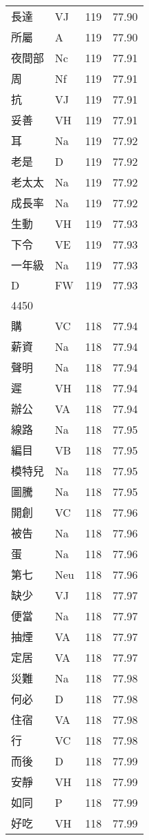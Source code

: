 \documentclass[twocolumn]{book}
\begin{document}
\begin{supertabular}{llrr}
長達 & VJ & 119 &  77.90\\
所屬 & A & 119 &  77.90\\
夜間部 & Nc & 119 &  77.91\\
周 & Nf & 119 &  77.91\\
抗 & VJ & 119 &  77.91\\
妥善 & VH & 119 &  77.91\\
耳 & Na & 119 &  77.92\\
老是 & D & 119 &  77.92\\
老太太 & Na & 119 &  77.92\\
成長率 & Na & 119 &  77.92\\
生動 & VH & 119 &  77.93\\
下令 & VE & 119 &  77.93\\
一年級 & Na & 119 &  77.93\\
D & FW & 119 &  77.93\\
4450\\
購 & VC & 118 &  77.94\\
薪資 & Na & 118 &  77.94\\
聲明 & Na & 118 &  77.94\\
遲 & VH & 118 &  77.94\\
辦公 & VA & 118 &  77.94\\
線路 & Na & 118 &  77.95\\
編目 & VB & 118 &  77.95\\
模特兒 & Na & 118 &  77.95\\
圖騰 & Na & 118 &  77.95\\
開創 & VC & 118 &  77.96\\
被告 & Na & 118 &  77.96\\
蛋 & Na & 118 &  77.96\\
第七 & Neu & 118 &  77.96\\
缺少 & VJ & 118 &  77.97\\
便當 & Na & 118 &  77.97\\
抽煙 & VA & 118 &  77.97\\
定居 & VA & 118 &  77.97\\
災難 & Na & 118 &  77.98\\
何必 & D & 118 &  77.98\\
住宿 & VA & 118 &  77.98\\
行 & VC & 118 &  77.98\\
而後 & D & 118 &  77.99\\
安靜 & VH & 118 &  77.99\\
如同 & P & 118 &  77.99\\
好吃 & VH & 118 &  77.99\\

\end{supertabular}
\end{document}

